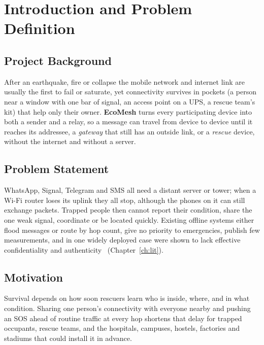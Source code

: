 \section{Introduction and Problem Definition}
\label{ch:intro}

\subsection{Project Background}
After an earthquake, fire or collapse the mobile network and internet link are usually the first to fail or saturate, yet connectivity survives in pockets (a person near a window with one bar of signal, an access point on a UPS, a rescue team's kit) that help only their owner. \textbf{EcoMesh} turns every participating device into both a sender and a relay, so a message can travel from device to device until it reaches its addressee, a \emph{gateway} that still has an outside link, or a \emph{rescue} device, without the internet and without a server.

\subsection{Problem Statement}
WhatsApp, Signal, Telegram and SMS all need a distant server or tower; when a Wi-Fi router loses its uplink they all stop, although the phones on it can still exchange packets. Trapped people then cannot report their condition, share the one weak signal, coordinate or be located quickly. Existing offline systems either flood messages or route by hop count, give no priority to emergencies, publish few measurements, and in one widely deployed case were shown to lack effective confidentiality and authenticity~\cite{albrecht2021bridgefy} (Chapter~\ref{ch:lit}).

\subsection{Motivation}
Survival depends on how soon rescuers learn who is inside, where, and in what condition. Sharing one person's connectivity with everyone nearby and pushing an SOS ahead of routine traffic at every hop shortens that delay for trapped occupants, rescue teams, and the hospitals, campuses, hostels, factories and stadiums that could install it in advance.

